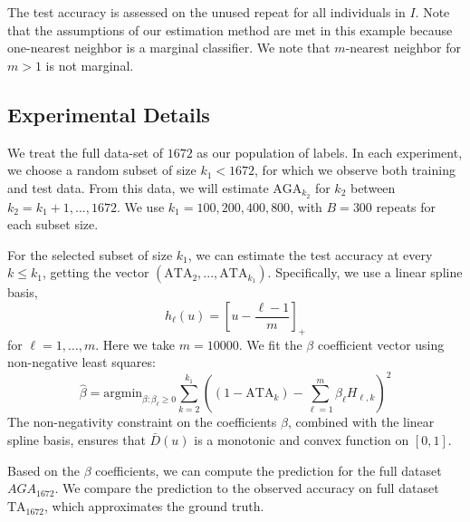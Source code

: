 \documentclass[twoside,11pt]{article}
\newcommand{\argmin}{\text{argmin}}
\begin{document}
The test accuracy is assessed on the unused repeat for all individuals
in $I$.  Note that the assumptions of our estimation method are met in
this example because one-nearest neighbor is a marginal classifier.
We note that $m$-nearest neighbor for $m > 1$ is not marginal.

\subsection{Experimental Details}\label{sec:exp_details}
We treat the full data-set of $1672$ as our population of labels. In each experiment, we choose a random subset of size $k_1<1672$, for which we observe both training and test data. From this data, we will estimate $\text{AGA}_{k_2}$ for $k_2$ between $k_2 = k_1+1,...,1672$. We use $k_1 = 100,200,400,800$, with $B = 300$ repeats for each subset size.

For the selected subset of size $k_1$, we can estimate the test accuracy at every $k \leq k_1$, getting the vector $(\text{ATA}_2,...,\text{ATA}_{k_1})$.
Specifically, we use a linear
spline basis,
\[
h_\ell(u) = \left[u - \frac{\ell - 1}{m}\right]_+
\]
for $\ell = 1,\hdots, m$.  Here we take $m = 10000$. 
We fit the $\beta$ coefficient vector using non-negative least squares: 
\[
\hat{\beta} = \argmin_{\beta: \beta_\ell \geq 0} \sum_{k=2}^{k_1} \left( (1 - \text{ATA}_k) - \sum_{\ell=1}^m \beta_\ell H_{\ell, k}\right)^2
\]
The non-negativity constraint on the
coefficients $\beta$, combined with the linear spline basis, ensures
that $\bar{D}(u)$ is a monotonic and convex function on $[0,1]$. 

Based on the $\beta$ coefficients, we can compute the prediction for the full dataset $\hat{AGA}_{1672}$.
We compare the prediction to the observed accuracy on full dataset $\text{TA}_{1672}$, which approximates the ground truth.
\end{document}
